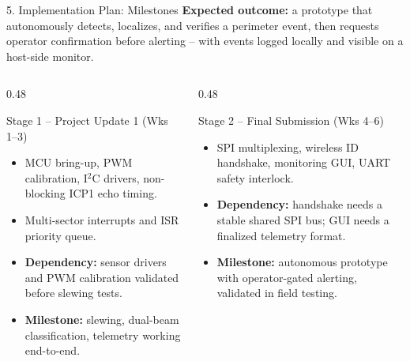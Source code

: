 \documentclass[aspectratio=169, 10pt]{beamer}
\begin{document}
\begin{frame}{5. Implementation Plan: Milestones}
    \small \textbf{Expected outcome:} a prototype that autonomously detects, localizes, and verifies a perimeter event, then requests operator confirmation before alerting -- with events logged locally and visible on a host-side monitor.
    \vspace{0.2cm}
    \begin{columns}[T]
        \begin{column}{0.48\textwidth}
            \begin{block}{Stage 1 -- Project Update 1 (Wks 1--3)}
                \footnotesize
                \begin{itemize}
                    \item MCU bring-up, PWM calibration, I$^2$C drivers, non-blocking ICP1 echo timing.
                    \item Multi-sector interrupts and ISR priority queue.
                    \item \textbf{Dependency:} sensor drivers and PWM calibration validated before slewing tests.
                    \item \textbf{Milestone:} slewing, dual-beam classification, telemetry working end-to-end.
                \end{itemize}
            \end{block}
        \end{column}
        \begin{column}{0.48\textwidth}
            \begin{block}{Stage 2 -- Final Submission (Wks 4--6)}
                \footnotesize
                \begin{itemize}
                    \item SPI multiplexing, wireless ID handshake, monitoring GUI, UART safety interlock.
                    \item \textbf{Dependency:} handshake needs a stable shared SPI bus; GUI needs a finalized telemetry format.
                    \item \textbf{Milestone:} autonomous prototype with operator-gated alerting, validated in field testing.
                \end{itemize}
            \end{block}
        \end{column}
    \end{columns}
\end{frame}
\end{document}
